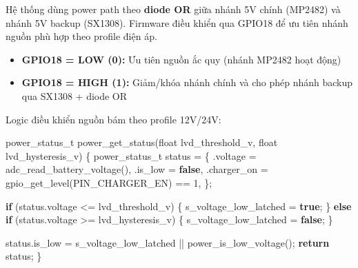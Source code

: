 \documentclass[13pt,a4paper]{extarticle}
\newenvironment{Shaded}{}{}
\newcommand{\ControlFlowTok}[1]{\textcolor[rgb]{0.00,0.44,0.13}{\textbf{#1}}}
\newcommand{\DataTypeTok}[1]{\textcolor[rgb]{0.56,0.13,0.00}{#1}}
\newcommand{\DecValTok}[1]{\textcolor[rgb]{0.25,0.63,0.44}{#1}}
\newcommand{\KeywordTok}[1]{\textcolor[rgb]{0.00,0.44,0.13}{\textbf{#1}}}
\newcommand{\NormalTok}[1]{#1}
\newcommand{\OperatorTok}[1]{\textcolor[rgb]{0.40,0.40,0.40}{#1}}
\renewcommand{\\}{\thesislongtableorignewline\hline}%
\providecommand{\tightlist}{%
  \setlength{\itemsep}{0pt}\setlength{\parskip}{0pt}}
\begin{document}
Hệ thống dùng power path theo \textbf{diode OR} giữa nhánh 5V chính
(MP2482) và nhánh 5V backup (SX1308). Firmware điều khiển qua GPIO18 để
ưu tiên nhánh nguồn phù hợp theo profile điện áp.

\begin{itemize}
\tightlist
\item
  \textbf{GPIO18 = LOW (0):} Ưu tiên nguồn ắc quy (nhánh MP2482 hoạt
  động)
\item
  \textbf{GPIO18 = HIGH (1):} Giảm/khóa nhánh chính và cho phép nhánh
  backup qua SX1308 + diode OR
\end{itemize}

Logic điều khiển nguồn bám theo profile 12V/24V:

\begin{Shaded}
\begin{Highlighting}[]
\NormalTok{power\_status\_t power\_get\_status}\OperatorTok{(}\DataTypeTok{float}\NormalTok{ lvd\_threshold\_v}\OperatorTok{,} \DataTypeTok{float}\NormalTok{ lvd\_hysteresis\_v}\OperatorTok{)} \OperatorTok{\{}
\NormalTok{    power\_status\_t status }\OperatorTok{=} \OperatorTok{\{}
        \OperatorTok{.}\NormalTok{voltage }\OperatorTok{=}\NormalTok{ adc\_read\_battery\_voltage}\OperatorTok{(),}
        \OperatorTok{.}\NormalTok{is\_low }\OperatorTok{=} \KeywordTok{false}\OperatorTok{,}
        \OperatorTok{.}\NormalTok{charger\_on }\OperatorTok{=}\NormalTok{ gpio\_get\_level}\OperatorTok{(}\NormalTok{PIN\_CHARGER\_EN}\OperatorTok{)} \OperatorTok{==} \DecValTok{1}\OperatorTok{,}
    \OperatorTok{\};}

    \ControlFlowTok{if} \OperatorTok{(}\NormalTok{status}\OperatorTok{.}\NormalTok{voltage }\OperatorTok{\textless{}=}\NormalTok{ lvd\_threshold\_v}\OperatorTok{)} \OperatorTok{\{}
\NormalTok{        s\_voltage\_low\_latched }\OperatorTok{=} \KeywordTok{true}\OperatorTok{;}
    \OperatorTok{\}} \ControlFlowTok{else} \ControlFlowTok{if} \OperatorTok{(}\NormalTok{status}\OperatorTok{.}\NormalTok{voltage }\OperatorTok{\textgreater{}=}\NormalTok{ lvd\_hysteresis\_v}\OperatorTok{)} \OperatorTok{\{}
\NormalTok{        s\_voltage\_low\_latched }\OperatorTok{=} \KeywordTok{false}\OperatorTok{;}
    \OperatorTok{\}}

\NormalTok{    status}\OperatorTok{.}\NormalTok{is\_low }\OperatorTok{=}\NormalTok{ s\_voltage\_low\_latched }\OperatorTok{||}\NormalTok{ power\_is\_low\_voltage}\OperatorTok{();}
    \ControlFlowTok{return}\NormalTok{ status}\OperatorTok{;}
\OperatorTok{\}}
\end{Highlighting}
\end{Shaded}
\end{document}
